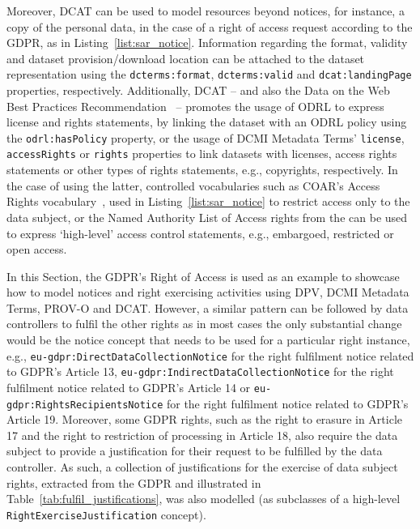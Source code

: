 Moreover, DCAT \citep{albertoni_data_2020} can be used to model resources beyond notices, for instance, a copy of the personal data, in the case of a right of access request according to the GDPR, as in Listing~\ref{list:sar_notice}.
Information regarding the format, validity and dataset provision/download location can be attached to the dataset representation using the \texttt{dcterms:format}, \texttt{dcterms:valid} and \texttt{dcat:landingPage} properties, respectively.
Additionally, DCAT -- and also the Data on the Web Best Practices Recommendation~\citep{loscio_data_2017} -- promotes the usage of ODRL to express license and rights statements, by linking the dataset with an ODRL policy using the \texttt{odrl:hasPolicy} property, or the usage of DCMI Metadata Terms' \texttt{license}, \texttt{accessRights} or \texttt{rights} properties to link datasets with licenses, access rights statements or other types of rights statements, e.g., copyrights, respectively.
In the case of using the latter, controlled vocabularies such as COAR's Access Rights vocabulary~\citep{apollaro_controlled_2022}, used in Listing~\ref{list:sar_notice} to restrict access only to the data subject, or the Named Authority List of Access rights from the \cite{publications_office_of_the_european_union_named_2023} can be used to express `high-level' access control statements, e.g., embargoed, restricted or open access.

In this Section, the GDPR's Right of Access is used as an example to showcase how to model notices and right exercising activities using DPV, DCMI Metadata Terms, PROV-O and DCAT.
However, a similar pattern can be followed by data controllers to fulfil the other rights as in most cases the only substantial change would be the notice concept that needs to be used for a particular right instance, e.g., \texttt{eu-gdpr:DirectDataCollectionNotice} for the right fulfilment notice related to GDPR's Article 13, \texttt{eu-gdpr:IndirectDataCollectionNotice} for the right fulfilment notice related to GDPR's Article 14 or \texttt{eu-gdpr:RightsRecipientsNotice} for the right fulfilment notice related to GDPR's Article 19.
Moreover, some GDPR rights, such as the right to erasure in Article 17 and the right to restriction of processing in Article 18, also require the data subject to provide a justification for their request to be fulfilled by the data controller.
As such, a collection of justifications for the exercise of data subject rights, extracted from the GDPR and illustrated in Table~\ref{tab:fulfil_justifications}, was also modelled (as subclasses of a high-level \texttt{RightExerciseJustification} concept). %


